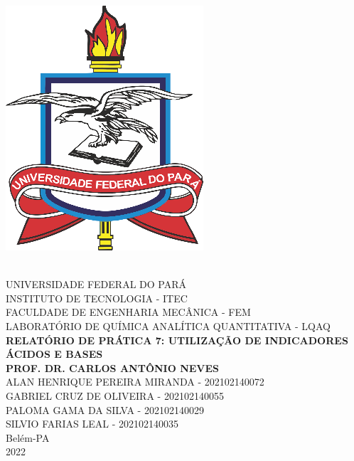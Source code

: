\thispagestyle{empty}
    \begin{center}
        \parbox{3cm}{\includegraphics[scale=1]{pictures/logo_ufpa}}\\
        \vspace{1cm}
        \Large \uppercase{Universidade Federal do Pará}\\
        \Large \uppercase{Instituto de Tecnologia - ITEC}\\
        \vspace{3cm}
        \Large \uppercase{Faculdade de Engenharia Mecânica - FEM}\\
        \Large \uppercase{Laboratório de Química Analítica Quantitativa - LQAQ}\\
        \vspace{3cm}
        \Large \textbf{\uppercase {Relatório de Prática 7: Utilização de Indicadores Ácidos e Bases}} \\
        \Large \textbf{\uppercase {PROF. DR. Carlos Antônio Neves}} \\
        \vspace{3cm}
        \Large \uppercase {Alan Henrique Pereira Miranda - 202102140072}\\
        \Large \uppercase {Gabriel Cruz de Oliveira - 202102140055}\\
        \Large \uppercase {Paloma Gama da Silva - 202102140029}\\
        \Large \uppercase {Silvio Farias Leal - 202102140035}\\
        \vspace{1cm}
        \Large {Belém-PA \\ 2022}

    \end{center}
